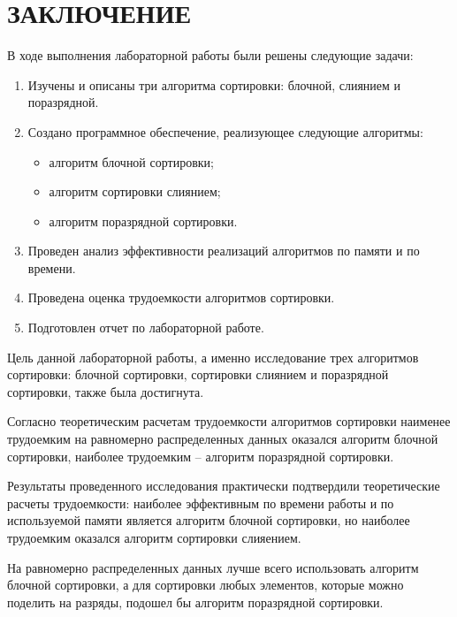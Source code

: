 \chapter*{ЗАКЛЮЧЕНИЕ}

В ходе выполнения лабораторной работы были решены следующие задачи:

\begin{enumerate}[label={\arabic*)}]
	\item Изучены и описаны три алгоритма сортировки: блочной, слиянием и поразрядной.
	\item Создано программное обеспечение, реализующее следующие алгоритмы:
	\begin{itemize}[label=--]
		\item алгоритм блочной сортировки;
		\item алгоритм сортировки слиянием;
		\item алгоритм поразрядной сортировки.
	\end{itemize}
	
	\item Проведен анализ эффективности реализаций алгоритмов по памяти и по времени.
	\item Проведена оценка трудоемкости алгоритмов сортировки.
	\item Подготовлен отчет по лабораторной работе.
\end{enumerate}

Цель данной лабораторной работы, а именно исследование трех алгоритмов сортировки: блочной сортировки, сортировки слиянием и поразрядной сортировки, также была достигнута.

Согласно теоретическим расчетам трудоемкости алгоритмов сортировки наименее трудоемким на равномерно распределенных данных оказался алгоритм блочной сортировки, наиболее трудоемким -- алгоритм поразрядной сортировки.

Результаты проведенного исследования практически подтвердили теоретические расчеты трудоемкости: наиболее эффективным по времени работы и по используемой памяти является алгоритм блочной сортировки, но наиболее трудоемким оказался алгоритм сортировки слияением.

На равномерно распределенных данных лучше всего использовать алгоритм блочной сортировки, а для сортировки любых элементов, которые можно поделить на разряды, подошел бы алгоритм поразрядной сортировки. 
